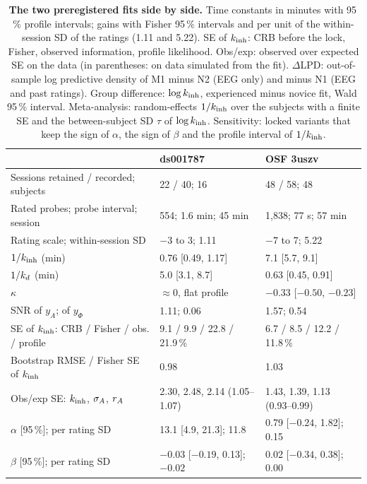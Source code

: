 \begin{table}[t]
\caption{\textbf{The two preregistered fits side by side.} Time constants in minutes with 95\,\% profile intervals; gains with Fisher 95\,\% intervals and per unit of the within-session SD of the ratings (1.11 and 5.22). SE of $k_{\mathrm{inh}}$: CRB before the lock, Fisher, observed information, profile likelihood. Obs/exp: observed over expected SE on the data (in parentheses: on data simulated from the fit). \mbox{$\Delta$}LPD: out-of-sample log predictive density of M1 minus N2 (EEG only) and minus N1 (EEG and past ratings). Group difference: $\log k_{\mathrm{inh}}$, experienced minus novice fit, Wald 95\,\% interval. Meta-analysis: random-effects $1/k_{\mathrm{inh}}$ over the subjects with a finite SE and the between-subject SD $\tau$ of $\log k_{\mathrm{inh}}$. Sensitivity: locked variants that keep the sign of $\alpha$, the sign of $\beta$ and the profile interval of $1/k_{\mathrm{inh}}$.}
\label{tab:compare}
\centering\footnotesize
\setlength{\tabcolsep}{4pt}
\begin{tabular}{lll}
\toprule
 & ds001787 & OSF 3uszv \\
\midrule
Sessions retained / recorded; subjects   & 22 / 40; 16 & 48 / 58; 48 \\
Rated probes; probe interval; session    & 554; 1.6 min; 45 min & 1,838; 77 s; 57 min \\
Rating scale; within-session SD          & $-3$ to $3$; 1.11 & $-7$ to $7$; 5.22 \\
$1/k_{\mathrm{inh}}$ (min)                          & 0.76 [0.49, 1.17] & 7.1 [5.7, 9.1] \\
$1/k_{d}$ (min)                            & 5.0 [3.1, 8.7] & 0.63 [0.45, 0.91] \\
$\kappa$                                 & $\approx0$, flat profile & $-0.33$ [$-0.50$, $-0.23$] \\
SNR of $y_A$; of $y_\Phi$                & 1.11; 0.06 & 1.57; 0.54 \\
SE of $k_{\mathrm{inh}}$: CRB / Fisher / obs. / profile & 9.1 / 9.9 / 22.8 / 21.9\,\% & 6.7 / 8.5 / 12.2 / 11.8\,\% \\
Bootstrap RMSE / Fisher SE of $k_{\mathrm{inh}}$    & 0.98 & 1.03 \\
Obs/exp SE: $k_{\mathrm{inh}}$, $\sigma_{A}$, $r_{A}$        & 2.30, 2.48, 2.14 (1.05--1.07) & 1.43, 1.39, 1.13 (0.93--0.99) \\
$\alpha$ [95\,\%]; per rating SD         & 13.1 [4.9, 21.3]; 11.8 & 0.79 [$-0.24$, 1.82]; 0.15 \\
$\beta$ [95\,\%]; per rating SD          & $-0.03$ [$-0.19$, 0.13]; $-0.02$ & 0.02 [$-0.34$, 0.38]; 0.00 \\

\end{tabular}
\end{table}
